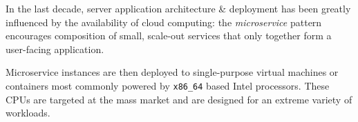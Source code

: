 \documentclass{article}
\begin{document}







In the last decade, server application architecture \& deployment has been greatly influenced by the availability of cloud computing:
the \textit{microservice} pattern encourages composition of small, scale-out services
that only together form a user-facing application.

Microservice instances are then deployed to single-purpose virtual machines or containers %
most commonly powered by \texttt{x86\_64} based Intel processors. %
These CPUs are targeted at the mass market and are designed for an extreme variety of workloads.
\end{document}
